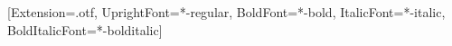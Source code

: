  {\setmainfont{Times New Roman}}
  {\setmainfont{texgyretermes}[Extension=.otf, UprightFont=*-regular, BoldFont=*-bold,
     ItalicFont=*-italic, BoldItalicFont=*-bolditalic]}
\def\EMlead{1.17}
